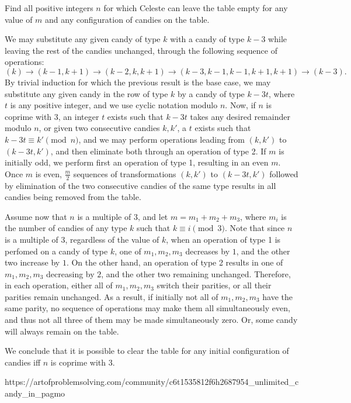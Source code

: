 \documentclass[a4paper]{article}
\begin{document}
\begin{question*}[]{}
{Find all positive integers $n$ for which Celeste can leave the table empty for any value of $m$ and any configuration of candies on the table.
    }{%
    We may substitute any given candy of type $k$ with a candy of type $k-3$ while leaving the rest of the candies unchanged, through the following sequence of operations:
$$(k)\to(k-1,k+1)\to(k-2,k,k+1)\to(k-3,k-1,k-1,k+1,k+1)\to(k-3).$$By trivial induction for which the previous result is the base case, we may substitute any given candy in the row of type $k$ by a candy of type $k-3t$, where $t$ is any positive integer, and we use cyclic notation modulo $n$. Now, if $n$ is coprime with $3$, an integer $t$ exists such that $k-3t$ takes any desired remainder modulo $n$, or given two consecutive candies $k,k'$, a $t$ exists such that $k-3t\equiv k'\pmod n$, and we may perform operations leading from $(k,k')$ to $(k-3t,k')$, and then eliminate both through an operation of type 2. If $m$ is initially odd, we perform first an operation of type 1, resulting in an even $m$. Once $m$ is even, $\frac{m}{2}$ sequences of transformations $(k,k')$ to $(k-3t,k')$ followed by elimination of the two consecutive candies of the same type results in all candies being removed from the table.

Assume now that $n$ is a multiple of $3$, and let $m=m_1+m_2+m_3$, where $m_i$ is the number of candies of any type $k$ such that $k\equiv i\pmod3$. Note that since $n$ is a multiple of $3$, regardless of the value of $k$, when an operation of type 1 is perfomed on a candy of type $k$, one of $m_1,m_2,m_3$ decreases by $1$, and the other two increase by $1$. On the other hand, an operation of type 2 results in one of $m_1,m_2,m_3$ decreasing by $2$, and the other two remaining unchanged. Therefore, in each operation, either all of $m_1,m_2,m_3$ switch their parities, or all their parities remain unchanged. As a result, if initially not all of $m_1,m_2,m_3$ have the same parity, no sequence of operations may make them all simultaneously even, and thus not all three of them may be made simultaneously zero. Or, some candy will always remain on the table.

We conclude that it is possible to clear the table for any initial configuration of candies iff $n$ is coprime with $3$.
    }{%
    https://artofproblemsolving.com/community/c6t1535812f6h2687954_unlimited_candy_in_pagmo
  }


\end{question*}
\end{document}
